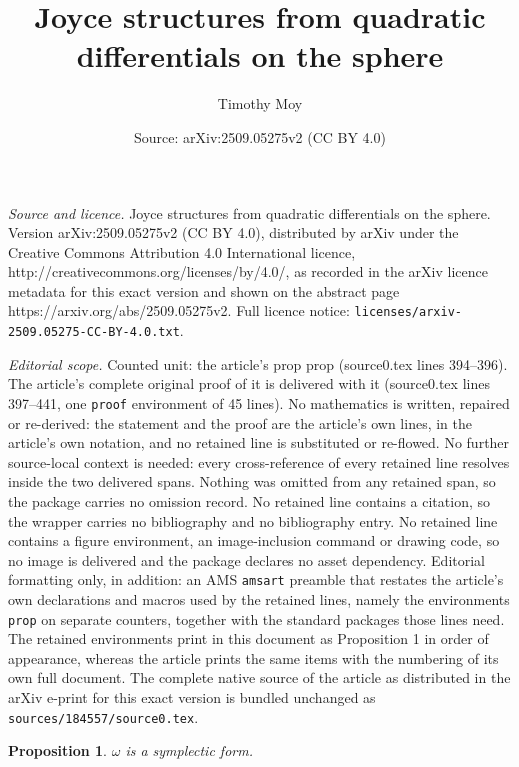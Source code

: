 \documentclass[10pt,a4paper]{amsart}
\title{Joyce structures from quadratic differentials on the sphere}
\author{Timothy Moy}
\date{Source: arXiv:2509.05275v2 (CC BY 4.0)}
\newtheorem{prop}{Proposition}
\begin{document}
\maketitle

\noindent\emph{Source and licence.} Joyce structures from quadratic differentials on the sphere. Version arXiv:2509.05275v2 (CC BY 4.0), distributed by arXiv under the Creative Commons Attribution 4.0 International licence, http://creativecommons.org/licenses/by/4.0/, as recorded in the arXiv licence metadata for this exact version and shown on the abstract page https://arxiv.org/abs/2509.05275v2. Full licence notice: \texttt{licenses/arxiv-2509.05275-CC-BY-4.0.txt}.\par\smallskip

\noindent\textit{Editorial scope.} Counted unit: the article's prop prop (source0.tex lines 394--396). The article's complete original proof of it is delivered with it (source0.tex lines 397--441, one \texttt{proof} environment of 45 lines). No mathematics is written, repaired or re-derived: the statement and the proof are the article's own lines, in the article's own notation, and no retained line is substituted or re-flowed.  No further source-local context is needed: every cross-reference of every retained line resolves inside the two delivered spans.  Nothing was omitted from any retained span, so the package carries no omission record.  No retained line contains a citation, so the wrapper carries no bibliography and no bibliography entry.  No retained line contains a figure environment, an image-inclusion command or drawing code, so no image is delivered and the package declares no asset dependency.  Editorial formatting only, in addition: an AMS \texttt{amsart} preamble that restates the article's own declarations and macros used by the retained lines, namely the environments \texttt{prop} on separate counters, together with the standard packages those lines need.  The retained environments print in this document as Proposition 1 in order of appearance, whereas the article prints the same items with the numbering of its own full document.  The complete native source of the article as distributed in the arXiv e-print for this exact version is bundled unchanged as \texttt{sources/184557/source0.tex}.
\begin{prop}
 $\omega$ is a symplectic form.  
\end{prop}
\end{document}
